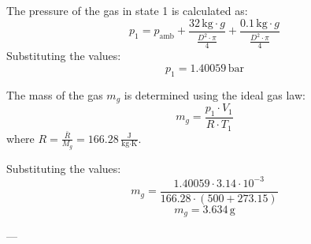 The pressure of the gas in state 1 is calculated as:  
\[
p_1 = p_{\text{amb}} + \frac{32 \, \text{kg} \cdot g}{\frac{D^2 \cdot \pi}{4}} + \frac{0.1 \, \text{kg} \cdot g}{\frac{D^2 \cdot \pi}{4}}
\]  
Substituting the values:  
\[
p_1 = 1.40059 \, \text{bar}
\]  

The mass of the gas \( m_g \) is determined using the ideal gas law:  
\[
m_g = \frac{p_1 \cdot V_1}{R \cdot T_1}
\]  
where \( R = \frac{\bar{R}}{M_g} = 166.28 \, \frac{\text{J}}{\text{kg·K}} \).  

Substituting the values:  
\[
m_g = \frac{1.40059 \cdot 3.14 \cdot 10^{-3}}{166.28 \cdot (500 + 273.15)}
\]  
\[
m_g = 3.634 \, \text{g}
\]  

---